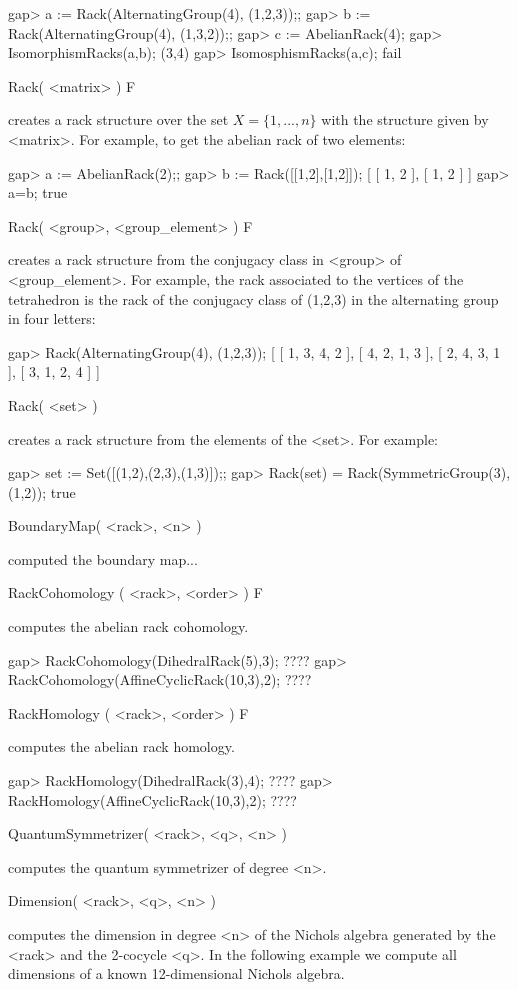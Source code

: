 \beginexample
gap> a := Rack(AlternatingGroup(4), (1,2,3));;
gap> b := Rack(AlternatingGroup(4), (1,3,2));;
gap> c := AbelianRack(4);
gap> IsomorphismRacks(a,b);
(3,4)
gap> IsomosphismRacks(a,c);
fail
\endexample

\>Rack( <matrix> ) F

creates a rack structure over the set $X=\{1,...,n\}$ with the structure 
given by <matrix>. For example, to get the abelian rack of two elements:

\beginexample
gap> a := AbelianRack(2);;
gap> b := Rack([[1,2],[1,2]]); 
[ [  1,  2 ],
  [  1,  2 ] ]
gap> a=b;
true
\endexample

\>Rack( <group>, <group_element> ) F

creates a rack structure from the conjugacy class in <group> of 
<group_element>. For example, the rack associated to the 
vertices of the tetrahedron is the rack of the conjugacy class
of (1,2,3) in the alternating group in four letters:

\beginexample
gap> Rack(AlternatingGroup(4), (1,2,3));
[ [  1,  3,  4,  2 ],
  [  4,  2,  1,  3 ],
  [  2,  4,  3,  1 ],
  [  3,  1,  2,  4 ] ]
\endexample

\>Rack( <set> )

creates a rack structure from the elements of the <set>. For example:

\beginexample
gap> set := Set([(1,2),(2,3),(1,3)]);;
gap> Rack(set) = Rack(SymmetricGroup(3), (1,2));
true
\endexample


\>BoundaryMap( <rack>, <n> ) 

computed the boundary map...

\>RackCohomology ( <rack>, <order> ) F

computes the abelian rack cohomology. 

\beginexample
gap> RackCohomology(DihedralRack(5),3);
????
gap> RackCohomology(AffineCyclicRack(10,3),2);
????
\endexample

\>RackHomology ( <rack>, <order> ) F

computes the abelian rack homology. 

\beginexample
gap> RackHomology(DihedralRack(3),4);
????
gap> RackHomology(AffineCyclicRack(10,3),2);
????
\endexample

\> QuantumSymmetrizer( <rack>, <q>, <n> )

computes the quantum symmetrizer of degree <n>.

\> Dimension( <rack>, <q>, <n> )

computes the dimension in degree <n> of the Nichols algebra generated 
by the <rack> and the 2-cocycle <q>. In the following example we 
compute all dimensions of a known 12-dimensional Nichols algebra.

